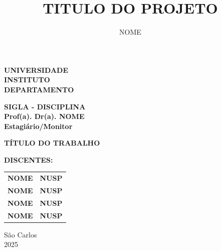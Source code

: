 \documentclass[
    article,
    hidelinks,
    12pt,
    openright,
    twoside,
    a4paper,
    sumario = tradicional,
    brazil
]{abntex2}
\title{TITULO DO PROJETO}
\author{NOME}
\begin{document}
\pagestyle{empty}

\begin{center}
    
    \textbf{UNIVERSIDADE}\\
    \textbf{INSTITUTO}\\
    \textbf{DEPARTAMENTO}\\
    \vspace{1.5cm}
    
    \textbf{SIGLA - DISCIPLINA\\Prof(a). Dr(a). NOME}\\
    \textbf{Estagiário/Monitor}\\
    \vspace{3.5cm}
    
    {\fontsize{18pt}{22.5pt}\selectfont \textbf{TÍTULO DO TRABALHO}}\\
    \vspace{3.5cm}
    
    \noindent\textbf{DISCENTES:}
    \vspace{1cm}
    
    \hspace*{5.8cm} %
    \begin{tabular}{@{}l l@{}}
        \textbf{NOME} & \textbf{NUSP} \\
        \textbf{NOME} & \textbf{NUSP} \\
        \textbf{NOME} & \textbf{NUSP} \\
        \textbf{NOME} & \textbf{NUSP} \\
    \end{tabular}
    
    \vfill
    {São Carlos\\2025}  
\end{center}

\cleardoublepage

\setcounter{page}{1} 

\listoffigures*
\cleardoublepage
\end{document}
